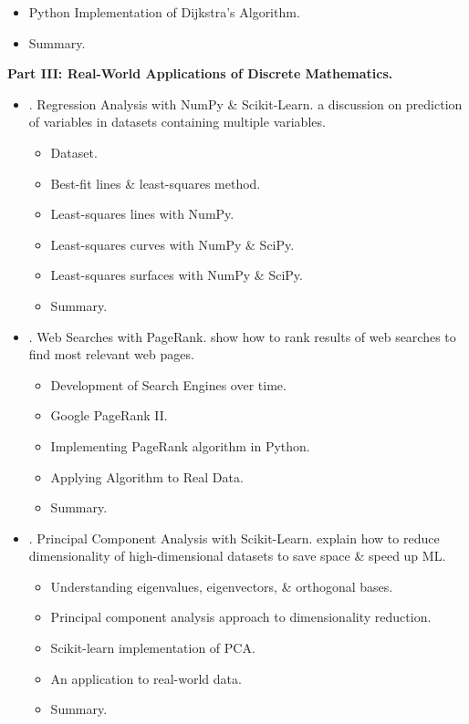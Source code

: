 \documentclass{article}
\begin{document}
\begin{enumerate}
\begin{itemize}
\begin{itemize}
			\item {\sf Python Implementation of Dijkstra's Algorithm.}
			\item {\sf Summary.}
		\end{itemize}
	\end{itemize}
	{\bf Part III: Real-World Applications of Discrete Mathematics.}
	\begin{itemize}
		\item {. Regression Analysis with NumPy \& Scikit-Learn.} a discussion on prediction of variables in datasets containing multiple variables.
		\begin{itemize}
			\item {\sf Dataset.}
			\item {\sf Best-fit lines \& least-squares method.}
			\item {\sf Least-squares lines with NumPy.}
			\item {\sf Least-squares curves with NumPy \& SciPy.}
			\item {\sf Least-squares surfaces with NumPy \& SciPy.}
			\item {\sf Summary.}
		\end{itemize}
		\item {. Web Searches with PageRank.} show how to rank results of web searches to find most relevant web pages.
		\begin{itemize}
			\item {\sf Development of Search Engines over time.}
			\item {\sf Google PageRank II.}
			\item {\sf Implementing PageRank algorithm in Python.}
			\item {\sf Applying Algorithm to Real Data.}
			\item {\sf Summary.}
		\end{itemize}
		\item {. Principal Component Analysis with Scikit-Learn.} explain how to reduce dimensionality of high-dimensional datasets to save space \& speed up ML.
		\begin{itemize}
			\item {\sf Understanding eigenvalues, eigenvectors, \& orthogonal bases.}
			\item {\sf Principal component analysis approach to dimensionality reduction.}
			\item {\sf Scikit-learn implementation of PCA.}
			\item {\sf An application to real-world data.}
			\item {\sf Summary.}
		\end{itemize}
	\end{itemize}
\end{enumerate}
\end{document}
